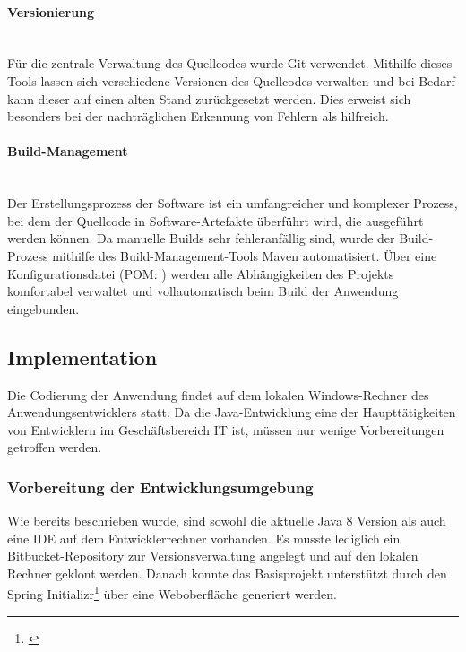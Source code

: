 \paragraph{Versionierung} ~\\\label{p:Versionierung}
Für die zentrale Verwaltung des Quellcodes wurde Git verwendet. Mithilfe dieses Tools lassen sich verschiedene Versionen des Quellcodes verwalten und bei Bedarf kann dieser auf einen alten Stand zurückgesetzt werden. Dies erweist sich besonders bei der nachträglichen Erkennung von Fehlern als hilfreich.

\paragraph{Build-Management} ~\\\label{p:Buildmangement}
Der Erstellungsprozess der Software ist ein umfangreicher und komplexer Prozess, bei dem der Quellcode in Software-Artefakte überführt wird, die ausgeführt werden können. Da manuelle Builds sehr fehleranfällig sind, wurde der Build-Prozess mithilfe des Build-Management-Tools Maven automatisiert. Über eine Konfigurationsdatei (\acs{POM}: ) werden alle Abhängigkeiten des Projekts komfortabel verwaltet und vollautomatisch beim Build der Anwendung eingebunden.


\subsection{Implementation} \label{sec:Implementierung}
Die Codierung der Anwendung findet auf dem lokalen Windows-Rechner des Anwendungsentwicklers statt. Da die Java-Entwicklung eine der Haupttätigkeiten von Entwicklern im Geschäftsbereich IT ist, müssen nur wenige Vorbereitungen getroffen werden.

\subsubsection{Vorbereitung der Entwicklungsumgebung}\label{sec:Entwicklungsumgebung}
Wie bereits beschrieben wurde, sind sowohl die aktuelle Java 8 Version als auch eine \ac{IDE} auf dem Entwicklerrechner vorhanden. Es musste lediglich ein Bitbucket-Repository zur Versionsverwaltung angelegt und auf den lokalen Rechner geklont werden. Danach konnte das Basisprojekt unterstützt durch den Spring Initializr\footnote{\cite{spring:init}} über eine Weboberfläche generiert werden.

